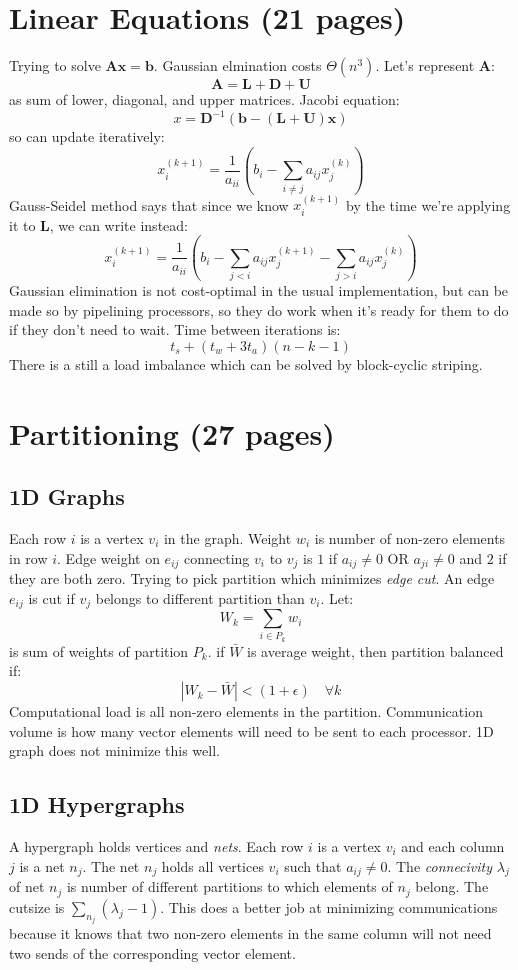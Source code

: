 \documentclass[a4paper,10pt]{article}
\begin{document}
\section{Linear Equations (21 pages)}
Trying to solve $\mathbf{A}\mathbf{x} = \mathbf{b}$.  Gaussian elmination costs $\Theta(n^3)$.  Let's represent $\mathbf{A}$:
\[\mathbf{A} = \mathbf{L} + \mathbf{D} + \mathbf{U}\]
as sum of lower, diagonal, and upper matrices.  Jacobi equation:
\[x = \mathbf{D}^{-1}(\mathbf{b} - (\mathbf{L}+\mathbf{U})\mathbf{x})\]
so can update iteratively:
\[ x^{(k+1)}_i = \frac{1}{a_{ii}}(b_i - \sum_{i\neq j} a_{ij}x^{(k)}_j)\]
Gauss-Seidel method says that since we know $x_i^{(k+1)}$ by the time we're applying it to $\mathbf{L}$, we can write instead:
\[ x^{(k+1)}_i = \frac{1}{a_{ii}}(b_i - \sum_{j < i} a_{ij}x^{(k+1)}_j -\sum_{j > i} a_{ij}x^{(k)}_j)\]
Gaussian elimination is not cost-optimal in the usual implementation, but can be made so by pipelining processors, so they do work when it's ready for them to do if they don't need to wait.  Time between iterations is:
\[ t_s + (t_w + 3t_a)(n - k - 1)\]
There is a still a load imbalance which can be solved by block-cyclic striping.
\section{Partitioning (27 pages)}
\subsection{1D Graphs}
Each row $i$ is a vertex $v_i$ in the graph.  Weight $w_i$ is number of non-zero elements in row $i$.  Edge weight on $e_{ij}$ connecting $v_i$ to $v_j$ is $1$ if $a_{ij} \neq 0$ OR $a_{ji}\neq 0$ and $2$ if they are both zero.  Trying to pick partition which minimizes \emph{edge cut}.  An edge $e_{ij}$ is cut if $v_j$ belongs to different partition than $v_i$.  Let:
\[W_k = \sum_{i\in P_k} w_i\]
is sum of weights of partition $P_k$.  if $\bar{W}$ is average weight, then partition balanced if:
\[|W_k - \bar{W}| < (1+\epsilon)\quad \forall k\]
Computational load is all non-zero elements in the partition.  Communication volume is how many vector elements will need to be sent to each processor.  1D graph does not minimize this well.
\subsection{1D Hypergraphs}
A hypergraph holds vertices and \emph{nets}.  Each row $i$ is a vertex $v_i$ and each column $j$ is a net $n_j$.  The net $n_j$ holds all vertices $v_i$ such that $a_{ij}\neq 0$.  The \emph{connecivity} $\lambda_j$ of net $n_j$ is number of different partitions to which elements of $n_j$ belong.  The cutsize is $\sum_{n_j} (\lambda_j - 1)$.  This does a better job at minimizing communications because it knows that two non-zero elements in the same column will not need two sends of the corresponding vector element.
\end{document}
